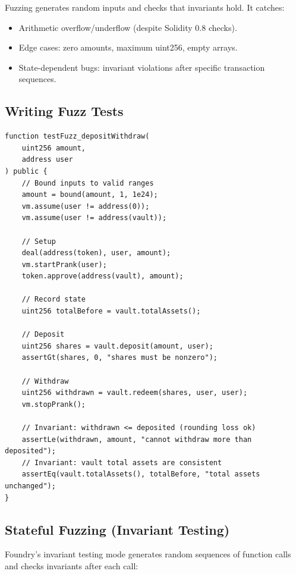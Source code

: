 \documentclass[11pt,a4paper]{article}
\begin{document}
Fuzzing generates random inputs and checks that invariants hold. It catches:
\begin{itemize}[nosep]
  \item Arithmetic overflow/underflow (despite Solidity 0.8 checks).
  \item Edge cases: zero amounts, maximum uint256, empty arrays.
  \item State-dependent bugs: invariant violations after specific transaction sequences.
\end{itemize}

\subsection{Writing Fuzz Tests}

\begin{lstlisting}[language=Solidity,caption={Foundry fuzz test example}]
function testFuzz_depositWithdraw(
    uint256 amount,
    address user
) public {
    // Bound inputs to valid ranges
    amount = bound(amount, 1, 1e24);
    vm.assume(user != address(0));
    vm.assume(user != address(vault));

    // Setup
    deal(address(token), user, amount);
    vm.startPrank(user);
    token.approve(address(vault), amount);

    // Record state
    uint256 totalBefore = vault.totalAssets();

    // Deposit
    uint256 shares = vault.deposit(amount, user);
    assertGt(shares, 0, "shares must be nonzero");

    // Withdraw
    uint256 withdrawn = vault.redeem(shares, user, user);
    vm.stopPrank();

    // Invariant: withdrawn <= deposited (rounding loss ok)
    assertLe(withdrawn, amount, "cannot withdraw more than deposited");
    // Invariant: vault total assets are consistent
    assertEq(vault.totalAssets(), totalBefore, "total assets unchanged");
}
\end{lstlisting}

\subsection{Stateful Fuzzing (Invariant Testing)}

Foundry's invariant testing mode generates random sequences of function calls and
checks invariants after each call:
\end{document}
